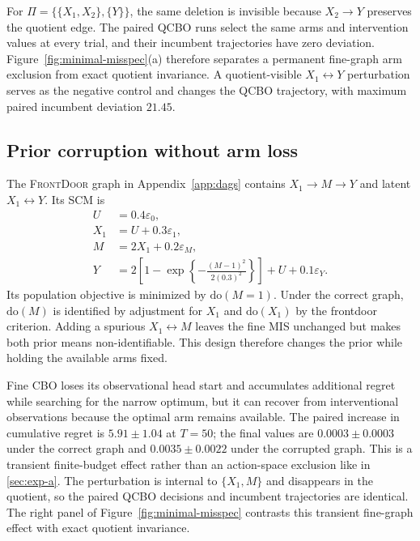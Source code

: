 \documentclass[twoside]{article}
\newcommand{\doo}{\mathrm{do}}
\begin{document}
For $\Pi=\{\{X_1,X_2\},\{Y\}\}$, the same deletion is invisible because $X_2\to Y$ preserves the quotient edge. The paired QCBO runs select the same arms and intervention values at every trial, and their incumbent trajectories have zero deviation. Figure~\ref{fig:minimal-misspec}(a) therefore separates a permanent fine-graph arm exclusion from exact quotient invariance. A quotient-visible $X_1\leftrightarrow Y$ perturbation serves as the negative control and changes the QCBO trajectory, with maximum paired incumbent deviation $21.45$.

\subsection{Prior corruption without arm loss}
\label{sec:exp-b}

The \textsc{FrontDoor} graph in Appendix~\ref{app:dags} contains
$X_1\to M\to Y$ and latent $X_1\leftrightarrow Y$. Its SCM is
\begin{equation}
 \begin{aligned}
 U&=0.4\varepsilon_0,\\ X_1&=U+0.3\varepsilon_1,\\
 M&=2X_1+0.2\varepsilon_M,\\
 Y&=2\!\left[1-\exp\!\left\{-\frac{(M-1)^2}{2(0.3)^2}\right\}\right]+U+0.1\varepsilon_Y.
 \end{aligned}
 \label{eq:frontdoor-scm}
\end{equation}
Its population objective is minimized by $\doo(M=1)$. Under the correct graph, $\doo(M)$ is identified by adjustment for $X_1$ and $\doo(X_1)$ by the frontdoor criterion. Adding a spurious $X_1\leftrightarrow M$ leaves the fine MIS unchanged but makes both prior means non-identifiable. This design therefore changes the prior while holding the available arms fixed.

Fine CBO loses its observational head start and accumulates additional regret while searching for the narrow optimum, but it can recover from interventional observations because the optimal arm remains available. The paired increase in cumulative regret is $5.91\pm1.04$ at $T=50$; the final values are $0.0003\pm0.0003$ under the correct graph and $0.0035\pm0.0022$ under the corrupted graph. This is a transient finite-budget effect rather than an action-space exclusion like in \ref{sec:exp-a}. The perturbation is internal to $\{X_1,M\}$ and disappears in the quotient, so the paired QCBO decisions and incumbent trajectories are identical. The right panel of Figure~\ref{fig:minimal-misspec} contrasts this transient fine-graph effect with exact quotient invariance.
\end{document}
